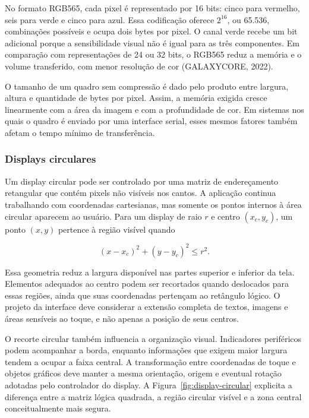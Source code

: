 \documentclass[a4paper,12pt]{article}
\begin{document}
No formato RGB565, cada pixel \'e representado por 16 bits: cinco para vermelho, seis para verde e cinco para azul. Essa codifica\c{c}\~ao oferece \(2^{16}\), ou 65.536, combina\c{c}\~oes poss\'iveis e ocupa dois bytes por pixel. O canal verde recebe um bit adicional porque a sensibilidade visual n\~ao \'e igual para as tr\^es componentes. Em compara\c{c}\~ao com representa\c{c}\~oes de 24 ou 32 bits, o RGB565 reduz a mem\'oria e o volume transferido, com menor resolu\c{c}\~ao de cor (GALAXYCORE, 2022).


O tamanho de um quadro sem compress\~ao \'e dado pelo produto entre largura, altura e quantidade de bytes por pixel. Assim, a mem\'oria exigida cresce linearmente com a \'area da imagem e com a profundidade de cor. Em sistemas nos quais o quadro \'e enviado por uma interface serial, esses mesmos fatores tamb\'em afetam o tempo m\'inimo de transfer\^encia.


\subsubsection{Displays circulares}


Um display circular pode ser controlado por uma matriz de endere\c{c}amento retangular que cont\'em pixels n\~ao vis\'iveis nos cantos. A aplica\c{c}\~ao continua trabalhando com coordenadas cartesianas, mas somente os pontos internos \`a \'area circular aparecem ao usu\'ario. Para um display de raio \(r\) e centro \((x_c,y_c)\), um ponto \((x,y)\) pertence \`a regi\~ao vis\'ivel quando


\[
(x-x_c)^2+(y-y_c)^2 \leq r^2.
\]


Essa geometria reduz a largura dispon\'ivel nas partes superior e inferior da tela. Elementos adequados ao centro podem ser recortados quando deslocados para essas regi\~oes, ainda que suas coordenadas perten\c{c}am ao ret\^angulo l\'ogico. O projeto da interface deve considerar a extens\~ao completa de textos, imagens e \'areas sens\'iveis ao toque, e n\~ao apenas a posi\c{c}\~ao de seus centros.


O recorte circular tamb\'em influencia a organiza\c{c}\~ao visual. Indicadores perif\'ericos podem acompanhar a borda, enquanto informa\c{c}\~oes que exigem maior largura tendem a ocupar a faixa central. A transforma\c{c}\~ao entre coordenadas de toque e objetos gr\'aficos deve manter a mesma orienta\c{c}\~ao, origem e eventual rota\c{c}\~ao adotadas pelo controlador do display. A Figura~\ref{fig:display-circular} explicita a diferen\c{c}a entre a matriz l\'ogica quadrada, a regi\~ao circular vis\'ivel e a zona central conceitualmente mais segura.
\end{document}
